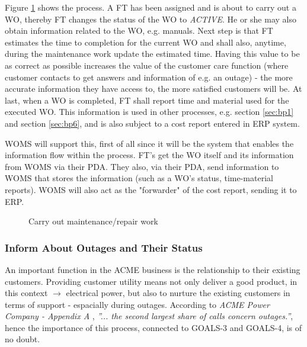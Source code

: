 Figure \ref{fig:carry} shows the process. A FT has been assigned and is about to carry out a WO, thereby FT changes the status of the WO to \emph{ACTIVE}. He or she may also obtain information related to the WO, e.g. manuals. Next step is that FT estimates the time to completion for the current WO and shall also, anytime, during the maintenance work update the estimated time. Having this value to be as correct as possible increases the value of the customer care function (where customer contacts to get answers and information of e.g. an outage) - the more accurate information they have access to, the more satisfied customers will be. At last, when a WO is completed, FT shall report time and material used for the executed WO. This information is used in other processes, e.g. section \ref{sec:bp1} and section \ref{sec:bp6}, and is also subject to a cost report entered in ERP system. 

WOMS will support this, first of all since it will be the system that enables the information flow within the process. FT's get the WO itself and its information from WOMS via their PDA. They also, via their PDA, send information to WOMS that stores the information (such as a WO's status, time-material reports). WOMS will also act as the "forwarder" of the cost report, sending it to ERP.
\begin{figure}[H]
	\centering
	\setlength\fboxsep{7pt}
	\setlength\fboxrule{0.5pt}
	\label{fig:carry}
	\caption{Carry out maintenance/repair work}
\end{figure}
%
\subsubsection{Inform About Outages and Their Status}
\label{sec:bp5}
An important function in the ACME business is the relationship to their existing customers. Providing customer utility means not only deliver a good product, in this context $\rightarrow$ electrical power, but also to nurture the existing customers in terms of support - espacially during outages. According to \emph{ACME Power Company - Appendix A} \cite{A}, \emph{''... the second largest share of calls concern outages.''}, hence the importance of this process, connected to GOALS-3 and GOALS-4, is of no doubt. 

